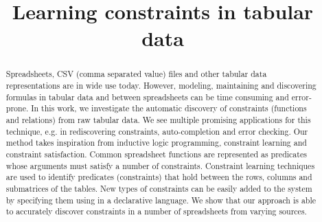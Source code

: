 \documentclass{sig-alternate-05-2015}
\begin{document}
\title{Learning constraints in tabular data}


\maketitle

\begin{abstract}
Spreadsheets, CSV (comma separated value) files and other tabular data representations are in wide use today. However, modeling, maintaining and discovering formulas in tabular data and between spreadsheets can be time consuming and error-prone. In this work, we investigate the automatic discovery of constraints (functions and relations) from raw tabular data. We see multiple promising applications for this technique, e.g. in rediscovering constraints, auto-completion and error checking. Our method takes inspiration from inductive logic programming, constraint learning and constraint satisfaction. Common spreadsheet functions are represented as predicates whose arguments must satisfy a number of constraints. Constraint learning techniques are used to identify predicates (constraints) that hold between the rows, columns and submatrices of the tables. New types of constraints can be easily added to the system by specifying them using in a declarative language. We show that our approach is able to accurately discover constraints in a number of spreadsheets from varying sources.
\end{abstract}
\end{document}
